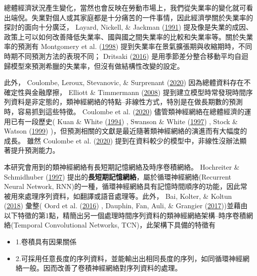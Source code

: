 \documentclass[oneside]{book}
\providecommand{\tightlist}{%
  \setlength{\itemsep}{0pt}\setlength{\parskip}{0pt}}
\begin{document}
總體經濟狀況產生變化，當然也會反映在勞動市場上，我們從失業率的變化就可看出端倪。失業對個人或其家庭都是十分痛苦的一件事情，因此經濟學關於失業率的探討的面向十分廣泛， Layard, Nickell, \& Jackman (\protect\hyperlink{ref-layardUnemploymentMacroeconomicPerformance1991}{1991}) 提及像是失業的成因、政策上可以如何改善降低失業率、國與國之間失業率的比較和失業率等。關於失業率的預測有 Montgomery et al. (\protect\hyperlink{ref-montgomeryForecastingUnemploymentRate1998}{1998}) 提到失業率在景氣擴張期與收縮期時，不同時期不同預測方法的表現不同； Dritsaki (\protect\hyperlink{ref-dritsakiForecastSarimaModels2016}{2016}) 是用季節差分整合移動平均自迴歸模型來預測希臘的失業率，但沒有做結構性改變的設定。

此外， Coulombe, Leroux, Stevanovic, \& Surprenant (\protect\hyperlink{ref-coulombeHowMachineLearning2020}{2020}) 因為總體資料存在不確定性與金融摩擦， Elliott \& Timmermann (\protect\hyperlink{ref-elliottEconomicForecasting2008}{2008}) 提到建立模型時常發現時間序列資料是非定態的，類神經網絡的特點--非線性方式，特別是在做長期數的預測時，容易抓到這些特徵。 Coulombe et al. (\protect\hyperlink{ref-coulombeHowMachineLearning2020}{2020}) 儘管類神經網絡在總體經濟的運用已有一段歷史( Kuan \& White (\protect\hyperlink{ref-kuanArtificialNeuralNetworks1994}{1994}) , Swanson \& White (\protect\hyperlink{ref-swansonModelSelectionApproach1997}{1997}) , Stock \& Watson (\protect\hyperlink{ref-stockCointegrationCausalityForecasting1999}{1999}) )，但預測相關的文獻是最近隨著類神經網絡的演進而有大幅度的成長。 雖然 Coulombe et al. (\protect\hyperlink{ref-coulombeHowMachineLearning2020}{2020}) 提到在資料較少的模型中，非線性沒辦法顯著提升預測能力。

本研究會用到的類神經網絡有長短期記憶網絡及時序卷積網絡。 Hochreiter \& Schmidhuber (\protect\hyperlink{ref-hochreiterLongShortTermMemory1997}{1997}) 提出的\textbf{長短期記憶網絡}，屬於循環神經網絡(Recurrent Neural Network, RNN)的一種，循環神經網絡具有記憶時間順序的功能，因此常被用來處理序列資料，如翻譯或語音處理等。此外， Bai, Kolter, \& Koltun (\protect\hyperlink{ref-baiEmpiricalEvaluationGeneric2018}{2018}) 彙整( Oord et al. (\protect\hyperlink{ref-oordWaveNetGenerativeModel2016}{2016}) , Dauphin, Fan, Auli, \& Grangier (\protect\hyperlink{ref-dauphinLanguageModelingGated2017}{2017}))並藉由以下特徵的第1點，精簡出另一個處理時間序列資料的類神經網絡架構--時序卷積網絡(Temporal Convolutional Networks, TCN)，此架構下具備的特徵有

\begin{itemize}
\tightlist
\item
  1.卷積具有因果關係
\item
  2.可採用任意長度的序列資料，並能輸出出相同長度的序列，如同循環神經網絡一般。因而改善了卷積神經網絡對序列資料的處理。
\end{itemize}
\end{document}
